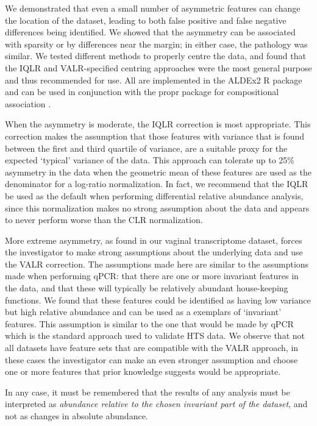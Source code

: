 \documentclass{bmcart}
\begin{document}
We demonstrated that even a small number of asymmetric features can change the location of the dataset, leading to both false positive and false negative differences being identified. We showed that the asymmetry can be associated with sparsity or by differences near the margin; in either case, the pathology was similar. We tested  different methods to properly centre the data, and found that the IQLR and VALR-specified centring approaches were the most general purpose and thus recommended for use. All are implemented in the ALDEx2 R package and can be used in conjunction with the propr package for compositional association \cite{Quinn:2017}. 

When the asymmetry is moderate, the IQLR correction is most appropriate. This correction makes the assumption that those features with variance that is found between the first and third quartile of variance, are a suitable proxy for the expected `typical' variance of the data. This approach can tolerate up to 25\% asymmetry in the data when the geometric mean of these features are used as the denominator for a log-ratio normalization. In fact, we recommend that the IQLR be used as the default when performing differential relative abundance analysis, since this normalization makes no strong assumption about the data and appears to never perform worse than the CLR normalization.

More extreme asymmetry, as found in our vaginal transcriptome dataset, forces the investigator to make strong assumptions about the underlying data and use the VALR correction. The assumptions made here are similar to the assumptions made when performing qPCR: that there are one or more invariant features in the data, and that these will typically be relatively abundant house-keeping functions. We found that these features could be identified as having low variance but high relative abundance and can be used as a exemplars of `invariant' features. This assumption is similar to the one that would be made by qPCR which is the standard approach used to validate HTS data. We observe that not all datasets have feature sets that are compatible with the VALR approach, in these cases the investigator can make an even stronger assumption and choose one or more features that prior knowledge suggests would be appropriate. 

In any case, it must be remembered that the results of any analysis must be interpreted as \emph{abundance relative to the chosen invariant part of the dataset}, and not as changes in absolute abundance.
\end{document}
